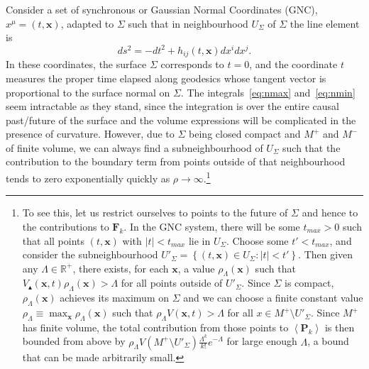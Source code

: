 \documentclass[12pt]{article}
\newcommand{\be}{\begin{equation}}
\newcommand{\ee}{\end{equation}}
\newcommand{\mb}[1]{\marginnote{\texttt{\small MB:\,#1}}}
\begin{document}
Consider a set of synchronous or Gaussian Normal Coordinates (GNC), $x^\mu= (t,\mathbf x)$, adapted to $\Sigma$ such that in neighbourhood $U_\Sigma$ of $\Sigma$ the line element is
\be
ds^2 = -dt^2 + h_{ij} (t,\mathbf x) dx^i dx^j.
\ee
In these coordinates, the surface $\Sigma$ corresponds to $t=0$, and the coordinate $t$ measures the proper time elapsed along geodesics whose tangent vector is proportional to the surface normal on $\Sigma$.
The integrals~\eqref{eq:nmax} and~\eqref{eq:nmin} seem intractable as they stand, since the integration is over the entire causal past/future of the surface and the volume expressions will be complicated in the presence of curvature. However, due to $\Sigma$ being closed compact and $M^+$ and $M^-$ of finite volume, we can always find a subneighbourhood of $U_\Sigma$ such that the contribution to the boundary term from points outside of that neighbourhood tends to zero exponentially quickly as $\rho\rightarrow\infty$.\footnote{To see this, let us restrict ourselves to points to the future of $\Sigma$ and hence to the contributions to $\mathbf F_k$. In the GNC system, there will be some $t_{max}>0$ such that all points $(t,\mathbf x)$ with $|t|<t_{max}$ lie in $U_\Sigma$. Choose some $t'<t_{max}$, and consider the subneighbourhood $U'_\Sigma=\left\{(t,\mathbf x)\in U_\Sigma: |t|<t'\right\}$. Then given any $\Lambda\in\mathbb R^+$, there exists, for each $\mathbf x$, a value $\rho_\Lambda(\mathbf x)$ such that $V_\blacktriangle(\mathbf x, t)\rho_\Lambda(\mathbf x)>\Lambda$ for all points outside of $U'_\Sigma$. Since $\Sigma$ is compact, $\rho_\Lambda(\mathbf x)$ achieves its maximum on $\Sigma$ and we can choose a finite constant value $\rho_\Lambda\equiv\max_{\mathbf{x}}\rho_\Lambda(\mathbf x)$ such that $\rho_\Lambda V(\mathbf x, t)>\Lambda$ for all $x\in M^+\setminus U'_\Sigma$. Since $M^+$ has finite volume, the total contribution from those points to $\left<\mathbf P_k\right>$ is then bounded from above by $\rho_\Lambda V(M^+\setminus U'_\Sigma)\frac{\Lambda^k}{k!}e^{-\Lambda}$ for large enough $\Lambda$, a bound that can be made arbitrarily small.} 
\end{document}
